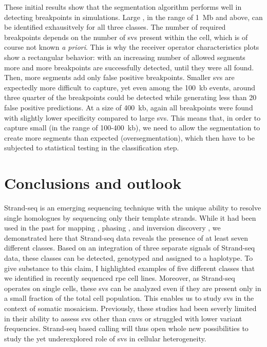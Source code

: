 These initial results show that the segmentation algorithm performs well in
detecting \sv breakpoints in simulations. Large \sv, in the range of 1~Mb and
above, can be identified exhausitvely for all three \sv classes. The number of
required breakpoints depends on the number of \acp{sv} present within the cell,
which is of course not known \emph{a priori}. This is why the receiver operator
characteristics plots show a rectangular behavior: with an increasing number of
allowed segments more and more \sv breakpoints are successfully detected, until
they were all found. Then, more segments add only false positive breakpoints.
Smaller \acp{sv} are expectedly more difficult to capture, yet even among the
100~kb events, around three quarter of the breakpoints could be detected while
generating less than 20 false positive predictions. At a size of 400~kb, again all
breakpoints were found with slightly lower specificity compared to large
\acp{sv}. This means that, in order to capture small \sv (in the range of
100-400~kb), we need to allow the segmentation to create more segments than
expected (oversegmentation), which then have to be subjected to statistical
testing in the classification step.





\section{Conclusions and outlook}
\label{sec:mosaic_conclusion}

Strand-seq is an emerging sequencing technique with the unique ability to
resolve single homologues by sequencing only their template strands. While it
had been used in the past for \sce mapping \citep{Falconer2012}, phasing
\citep{Porubsky2016}, and inversion discovery \citep{Sanders2017}, we
demonstrated here that Strand-seq data reveals the presence of at least seven
different \sv classes. Based on an integration of three separate signals of
Strand-seq data, these \sv classes can be detected, genotyped and assigned to a
haplotype. To give substance to this claim, I highlighted examples of five
different \sv classes that we identified in recently sequenced \acf{rpe} cell lines.
Moreover, as Strand-seq operates on single cells, these \acp{sv} can be analyzed
even if they are present only in a small fraction of the total cell population.
This enables us to study \acp{sv} in the context of somatic mosaicism.
Previously, these studies had been severly limited in their ability to assess
\acp{sv} other than \acp{cnv} or struggled with lower variant frequencies.
Strand-seq based \sv calling will thus open whole new possibilities to study
the yet underexplored role of \acp{sv} in cellular heterogeneity.

